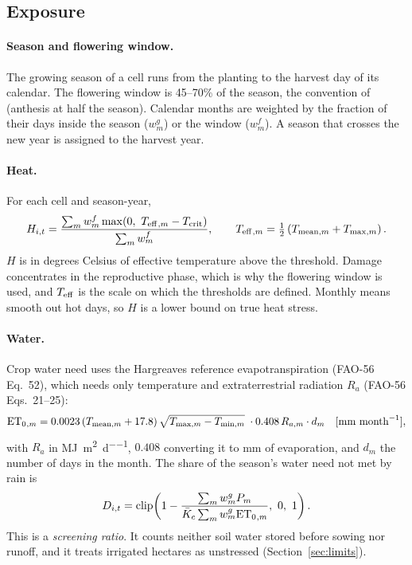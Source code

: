 \subsection{Exposure}\label{sec:exposure}
\paragraph{Season and flowering window.} The growing season of a cell runs from the planting to the harvest day of
its calendar. The flowering window is 45--70\% of the season, the convention of \citet{deryng2014} (anthesis at
half the season). Calendar months are weighted by the fraction of their days inside the season ($w^g_m$) or the
window ($w^f_m$). A season that crosses the new year is assigned to the harvest year.

\paragraph{Heat.} For each cell and season-year,
\begin{equation}\label{eq:heatcell}
H_{i,t} = \frac{\sum_m w^f_m \max\!\left(0,\ \Teff{}_{,m}-\Tcrit\right)}{\sum_m w^f_m}, \qquad
\Teff{}_{,m} = \tfrac12\left(T_{\text{mean},m}+T_{\max,m}\right).
\end{equation}
$H$ is in degrees Celsius of effective temperature above the threshold. Damage concentrates in the
reproductive phase, which is why the flowering window is used, and $T_{\mathrm{eff}}$ is the scale on which the
\citet{deryng2014} thresholds are defined. Monthly means smooth out hot days, so $H$ is a lower bound on true heat
stress.

\paragraph{Water.} Crop water need uses the Hargreaves reference evapotranspiration (FAO-56 Eq.~52), which needs
only temperature and extraterrestrial radiation $R_a$ (FAO-56 Eqs.~21--25):
\begin{equation}\label{eq:et0}
\mathrm{ET_0}{}_{,m} = 0.0023\,(T_{\text{mean},m}+17.8)\,\sqrt{T_{\max,m}-T_{\min,m}}\;\cdot 0.408\,R_{a,m}\cdot d_m \quad[\text{mm month}^{-1}],
\end{equation}
with $R_a$ in \si{\mega\joule\per\square\metre\per\day}, $0.408$ converting it to mm of evaporation, and $d_m$ the
number of days in the month. The share of the season's water need not met by rain is
\begin{equation}\label{eq:deficit}
D_{i,t} = \operatorname{clip}\!\left(1-\frac{\sum_m w^g_m P_m}{\bar K_c\sum_m w^g_m \mathrm{ET_0}{}_{,m}},\ 0,\ 1\right).
\end{equation}
This is a \emph{screening ratio}. It counts neither soil water stored before sowing nor runoff, and it treats
irrigated hectares as unstressed (Section~\ref{sec:limits}).

